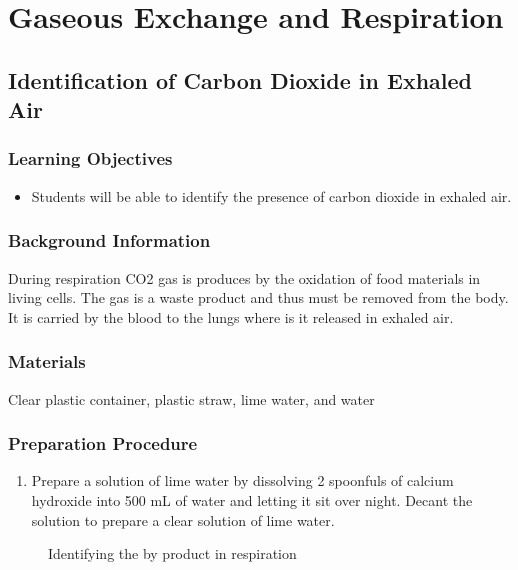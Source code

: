 \section{Gaseous Exchange and Respiration}

\subsection{Identification of Carbon Dioxide in Exhaled Air}

\subsubsection*{Learning Objectives}
\begin{itemize}
\item{Students will be able to identify the presence of carbon dioxide in exhaled air.}
\end{itemize}

\subsubsection*{Background Information}
During respiration CO2 gas is produces by the oxidation of food materials in living cells. The gas is a waste product and thus must be removed from the body. It is carried by the blood to the lungs where is it released in exhaled air.

\subsubsection*{Materials}
Clear plastic container, plastic straw, lime water, and water

\subsubsection*{Preparation Procedure}
\begin{enumerate}
\item{Prepare a solution of lime water by dissolving 2 spoonfuls of calcium hydroxide into 500 mL of water and letting it sit over night. Decant the solution to prepare a clear solution of lime water.}
\end{enumerate}

\begin{figure}
\begin{center}
\def\svgwidth{2cm}

\caption{Identifying the by product  in respiration}
\label{fig:CO2-limewater}
\end{center}
\end{figure}

